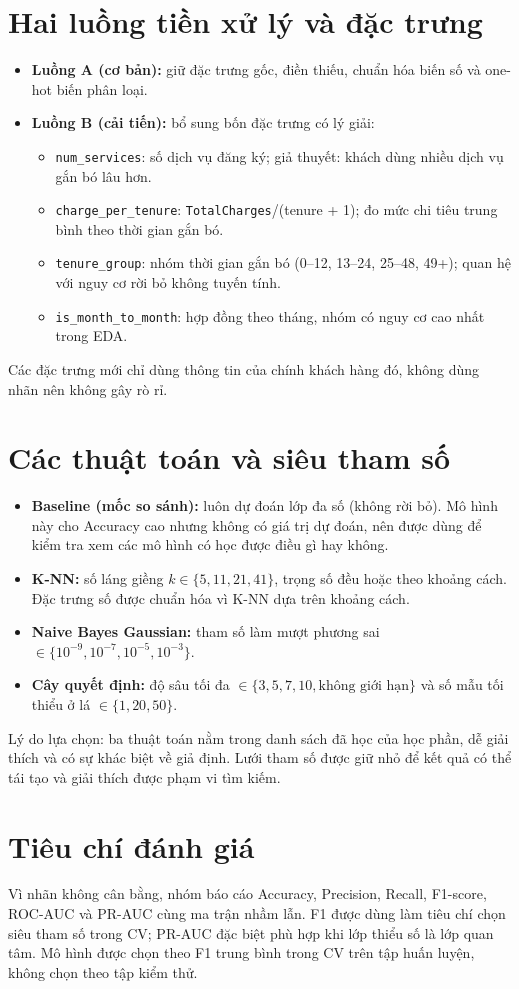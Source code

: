 \section{Hai luồng tiền xử lý và đặc trưng}
\begin{itemize}
    \item \textbf{Luồng A (cơ bản):} giữ đặc trưng gốc, điền thiếu, chuẩn hóa biến số và one-hot biến phân loại.
    \item \textbf{Luồng B (cải tiến):} bổ sung bốn đặc trưng có lý giải:
    \begin{itemize}
        \item \texttt{num\_services}: số dịch vụ đăng ký; giả thuyết: khách dùng nhiều dịch vụ gắn bó lâu hơn.
        \item \texttt{charge\_per\_tenure}: \texttt{TotalCharges}/(tenure + 1); đo mức chi tiêu trung bình theo thời gian gắn bó.
        \item \texttt{tenure\_group}: nhóm thời gian gắn bó (0--12, 13--24, 25--48, 49+); quan hệ với nguy cơ rời bỏ không tuyến tính.
        \item \texttt{is\_month\_to\_month}: hợp đồng theo tháng, nhóm có nguy cơ cao nhất trong EDA.
    \end{itemize}
\end{itemize}
Các đặc trưng mới chỉ dùng thông tin của chính khách hàng đó, không dùng nhãn nên không gây rò rỉ.

\section{Các thuật toán và siêu tham số}
\begin{itemize}
    \item \textbf{Baseline (mốc so sánh):} luôn dự đoán lớp đa số (không rời bỏ). Mô hình này cho Accuracy cao nhưng không có giá trị dự đoán,
    nên được dùng để kiểm tra xem các mô hình có học được điều gì hay không.
    \item \textbf{K-NN:} số láng giềng $k \in \{5, 11, 21, 41\}$, trọng số đều hoặc theo khoảng cách. Đặc trưng số được chuẩn hóa vì K-NN dựa trên khoảng cách.
    \item \textbf{Naive Bayes Gaussian:} tham số làm mượt phương sai $\in \{10^{-9}, 10^{-7}, 10^{-5}, 10^{-3}\}$.
    \item \textbf{Cây quyết định:} độ sâu tối đa $\in \{3, 5, 7, 10, \text{không giới hạn}\}$ và số mẫu tối thiểu ở lá $\in \{1, 20, 50\}$.
\end{itemize}
Lý do lựa chọn: ba thuật toán nằm trong danh sách đã học của học phần, dễ giải thích và có sự khác biệt về giả định.
Lưới tham số được giữ nhỏ để kết quả có thể tái tạo và giải thích được phạm vi tìm kiếm.

\section{Tiêu chí đánh giá}
Vì nhãn không cân bằng, nhóm báo cáo Accuracy, Precision, Recall, F1-score, ROC-AUC và PR-AUC cùng ma trận nhầm lẫn.
F1 được dùng làm tiêu chí chọn siêu tham số trong CV; PR-AUC đặc biệt phù hợp khi lớp thiểu số là lớp quan tâm.
Mô hình được chọn theo F1 trung bình trong CV trên tập huấn luyện, không chọn theo tập kiểm thử.
